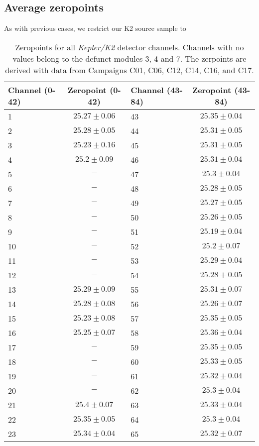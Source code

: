 \documentclass{aastex63}
\begin{document}
\subsection{Average zeropoints}
As with previous cases, we restrict our K2 source sample to 


\begin{table*}
\centering
 \caption{Zeropoints for all \textit{Kepler/K2} detector channels. Channels with no values belong to the defunct modules 3, 4 and 7. The zerpoints are derived with data from Campaigns C01, C06, C12, C14, C16, and C17. }
 \label{tab:zeropoints}
 \begin{tabular}{lc|lc}
  \hline
  Channel (0-42) & Zeropoint (0-42) & Channel (43-84) & Zeropoint (43-84) \\
  \hline
  1 & $25.27\pm0.06$ & 43 & $25.35\pm0.04$ \\
2 & $25.28\pm0.05$ & 44 & $25.31\pm0.05$ \\
3 & $25.23\pm0.16$ & 45 & $25.31\pm0.05$ \\
4 & $25.2\pm0.09$ & 46 & $25.31\pm0.04$ \\
5 & $-$ & 47 & $25.3\pm0.04$ \\
6 & $-$ & 48 & $25.28\pm0.05$ \\
7 & $-$ & 49 & $25.27\pm0.05$ \\
8 & $-$ & 50 & $25.26\pm0.05$ \\
9 & $-$ & 51 & $25.19\pm0.04$ \\
10 & $-$ & 52 & $25.2\pm0.07$ \\
11 & $-$ & 53 & $25.29\pm0.04$ \\
12 & $-$ & 54 & $25.28\pm0.05$ \\
13 & $25.29\pm0.09$ & 55 & $25.31\pm0.07$ \\
14 & $25.28\pm0.08$ & 56 & $25.26\pm0.07$ \\
15 & $25.23\pm0.08$ & 57 & $25.35\pm0.05$ \\
16 & $25.25\pm0.07$ & 58 & $25.36\pm0.04$ \\
17 & $-$ & 59 & $25.35\pm0.05$ \\
18 & $-$ & 60 & $25.33\pm0.05$ \\
19 & $-$ & 61 & $25.32\pm0.04$ \\
20 & $-$ & 62 & $25.3\pm0.04$ \\
21 & $25.4\pm0.07$ & 63 & $25.33\pm0.04$ \\
22 & $25.35\pm0.05$ & 64 & $25.3\pm0.04$ \\
23 & $25.34\pm0.04$ & 65 & $25.32\pm0.07$ \\

\end{tabular}
\end{table*}
\end{document}
